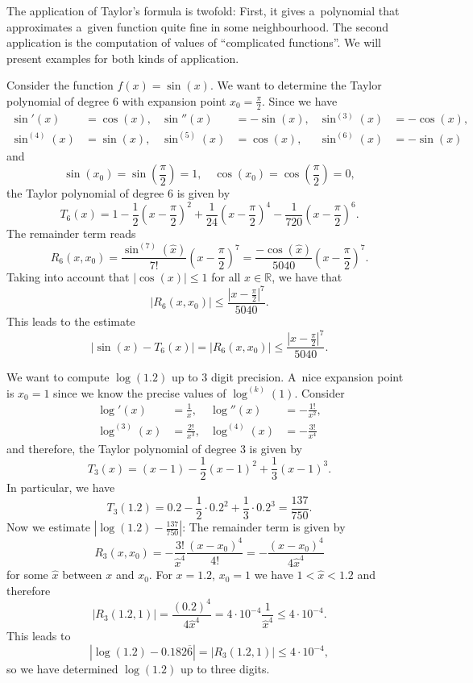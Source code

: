 

The application of Taylor's formula is twofold: First, it gives a~polynomial that approximates a~given function quite fine in some neighbourhood. 
The second application is the computation of values of ``complicated functions''. We will present examples for both kinds of application.
\begin{example}
Consider the function $f(x)=\sin(x)$. We want to determine the Taylor polynomial of degree 6 with expansion point $x_0=\frac\pi2$. Since we have
\[
\begin{aligned}
\sin'(x)&=\cos(x),&\sin''(x)&=-\sin(x),&\sin^{(3)}(x)&=-\cos(x),\\
\sin^{(4)}(x)&=\sin(x),&\sin^{(5)}(x)&=\cos(x),&\sin^{(6)}(x)&=-\sin(x)
\end{aligned}
\]
and
\[\sin(x_0)=\sin\left(\frac\pi2\right)=1,\quad \cos(x_0)=\cos\left(\frac\pi2\right)=0,\]
the Taylor polynomial of degree 6 is given by
\[T_6(x)=1-\frac12\left(x-\frac{\pi}{2}\right)^2+\frac{1}{24}\left(x-\frac{\pi}{2}\right)^4-\frac1{720}\left(x-\frac{\pi}{2}\right)^6.\]
The remainder term reads
\[R_6(x,x_0)=\frac{\sin^{(7)}(\hat{x})}{7!}\left(x-\frac{\pi}{2}\right)^{7}
=\frac{-\cos(\hat{x})}{5040}\left(x-\frac{\pi}{2}\right)^{7}.\]
    Taking into account that $|\cos(x)|\leq1$ for all $x\in\mathbb{R}$, we have that
\[|R_6(x,x_0)|\leq\frac{\left|x-\frac{\pi}{2}\right|^{7}}{5040}.\]
This leads to the estimate
\[|\sin(x)-T_6(x)|=|R_6(x,x_0)|\leq\frac{\left|x-\frac{\pi}{2}\right|^{7}}{5040}.\]
\end{example}
\begin{example}
We want to compute $\log(1.2)$ up to 3 digit precision. A~nice expansion point is $x_0=1$ since we know the precise values of $\log^{(k)}(1)$. Consider
\[
\begin{aligned}
\log'(x)&=\frac1x,&\log''(x)&=-\frac{1!}{x^2},\\
\log^{(3)}(x)&=\frac{2!}{x^3},&\log^{(4)}(x)&=-\frac{3!}{x^4}
\end{aligned}
\]
and therefore, the Taylor polynomial of degree 3 is given by
\[T_3(x)=(x-1)-\frac12(x-1)^2+\frac13(x-1)^3.\]
In particular, we have
\[T_3(1.2)=0.2-\frac12\cdot 0.2^2+\frac13 \cdot 0.2^3=\frac{137}{750}.\]
Now we estimate $|\log(1.2)-\frac{137}{750}|$: The remainder term is given by
\[R_3(x,x_0)=-\frac{3!}{\hat{x}^4}\frac{(x-x_0)^{4}}{4!}=-\frac{(x-x_0)^{4}}{4\hat{x}^4}\]
for some $\hat{x}$ between $x$ and $x_0$. For $x=1.2$, $x_0=1$ we have $1<\hat{x}<1.2$ and therefore
\[ | R_3(1.2,1) | =\frac{(0.2)^{4}}{4\hat{x}^4}=4\cdot10^{-4}\frac{1}{\hat{x}^4}\leq4\cdot10^{-4}.\]
This leads to
\[|\log(1.2)-0.182\overline{6}|=|R_3(1.2,1)|\leq4\cdot10^{-4},\]
so we have determined $\log(1.2)$ up to three digits.
\end{example}

